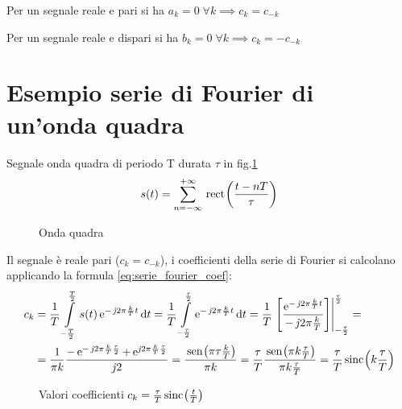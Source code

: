 Per un segnale reale e pari si ha $a_k=0\;\forall k \implies c_k=c_{-k}$

Per un segnale reale e dispari si ha $b_k=0\;\forall k \implies c_k=-c_{-k}$

\section{Esempio serie di Fourier di un'onda quadra}
\begin{esempio}
Segnale onda quadra di periodo T durata $\tau$ in fig.\ref*{fig:onda_quadra} \[s(t)=\sum_{n=-\infty}^{+\infty}\,{\operatorname{rect}}^{}\!\left({\frac{t-n T}{\tau}}\right)\]

\begin{figure}[ht]
\begin{center}
\end{center}
\caption{Onda quadra}\label{fig:onda_quadra}
\end{figure}
Il segnale è reale pari ($c_k=c_{-k}$), i coefficienti della serie di Fourier si calcolano applicando la formula \ref{eq:serie_fourier_coef}:
\begin{align*}
	c_k&=\frac{1}{T}\intd{-\frac{T}{2}}{\frac{T}{2}}{s(t)\e{-\imath 2\pi\frac{k}{T}t}}{t}
		=\frac{1}{T}\intd{-\frac{\tau}{2}}{\frac{\tau}{2}}{\e{-\imath 2\pi\frac{k}{T}t}}{t}
		=\frac{1}{T}\bound{-\frac{\tau}{2}}{\frac{\tau}{2}}{ \frac{\e{-\imath 2\pi\frac{k}{T}t}}{-\imath 2\pi\frac{k}{T}}}=\\
	&=\frac{1}{\pi k} \frac{-\e{-\imath 2\pi\frac{k}{T}\frac{\tau}{2}}+\e{\imath 2\pi\frac{k}{T}\frac{\tau}{2}}}{\imath 2}
	 =\frac{\sen{\pi \tau \frac{k}{T}}}{\pi k}
	 =\frac{\tau}{T}\frac{\sen{\pi k \frac{\tau}{T}}}{\pi k \frac{\tau}{T}}
	 =\frac{\tau}{T}\sinc{k \frac{\tau}{T}}
\end{align*}

\begin{figure}[ht]
\centering
{}
\caption{Valori coefficienti $c_k=\frac{\tau}{T}\,{\operatorname{sinc}}^{}\!\left({\frac{t}{T}}\right)$}
\label{fig:sinc_onda_quadra}
\end{figure}
\end{esempio}

